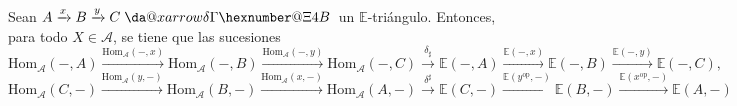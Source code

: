 \documentclass[preview]{standalone}
\makeatletter
\newcommand*{\da@xarrow}[7]{%
                                 \sbox0{$\ifx#7\scriptstyle\scriptscriptstyle\else\scriptstyle\fi#5#1#6\m@th$}%
                                 \sbox2{$\ifx#7\scriptstyle\scriptscriptstyle\else\scriptstyle\fi#5#2#6\m@th$}%
                                 \sbox4{$#7\dabar@\m@th$}%
                                 \dimen@=\wd0 %
                                 \ifdim\wd2 >\dimen@
                                   \dimen@=\wd2 %
                                 \fi
                                 \count@=2 %
                                 \def\da@bars{\dabar@\dabar@}%
                                 \@whiledim\count@\wd4<\dimen@\do{%
                                   \advance\count@\@ne
                                   \expandafter\def\expandafter\da@bars\expandafter{%
                                     \da@bars
                                     \dabar@ 
                                   }%
                                 }%
                                 \mathrel{#3}%
                                 \mathrel{%
                                   \mathop{\da@bars}\limits
                                   \ifx\\#1\\%
                                   \else
                                     _{\copy0}%
                                   \fi
                                   \ifx\\#2\\%
                                   \else
                                     ^{\copy2}%
                                   \fi
                                 }%
                                 \mathrel{#4}%
                               }
\newcommand*{\da@rightarrow}{\mathchar"0\hexnumber@\symAMSa 4B }
\newcommand*{\xdashrightarrow}[2][]{%
                                 \mathrel{%
                                   \mathpalette{\da@xarrow{#1}{#2}{}\da@rightarrow{\,}{}}{}%
                                 }%
                               }
\makeatother
\begin{document}
\begin{center}
Sean $A\xrightarrow{x} B\xrightarrow{y} C\xdashrightarrow{\delta}$ un $\mathbb{E}$-triángulo. Entonces, para todo $X\in\mathscr{A}$, se tiene que las sucesiones $$\text{Hom}_\mathscr{A}(-,A) \xrightarrow{\text{Hom}_\mathscr{A}(-,x)} \text{Hom}_\mathscr{A}(-,B) \xrightarrow{\text{Hom}_\mathscr{A}(-,y)} \text{Hom}_\mathscr{A}(-,C) \xrightarrow{\delta_\sharp} \mathbb{E}(-,A) \xrightarrow{\mathbb{E}(-,x)} \mathbb{E}(-,B) \xrightarrow{\mathbb{E}(-,y)} \mathbb{E}(-,C),$$ $$\text{Hom}_\mathscr{A}(C,-) \xrightarrow{\text{Hom}_\mathscr{A}(y,-)} \text{Hom}_\mathscr{A}(B,-) \xrightarrow{\text{Hom}_\mathscr{A}(x,-)} \text{Hom}_\mathscr{A}(A,-) \xrightarrow{\delta^\sharp} \mathbb{E}(C,-) \xrightarrow{\mathbb{E}(y^\text{op},-)} \mathbb{E}(B,-) \xrightarrow{\mathbb{E}(x^\text{op},-)} \mathbb{E}(A,-)$$
\end{center}
\end{document}
